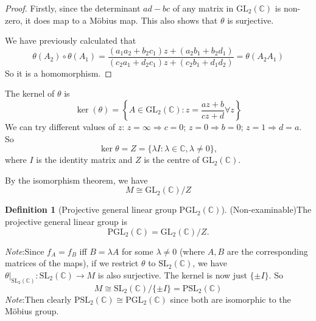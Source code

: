 \documentclass[a4paper]{article}
\theoremstyle{definition}
\newtheorem*{defi}{Definition}
\newcommand{\note}{\noindent \emph{Note}:\;}
\newcommand{\C}{\mathbb{C}}
\newcommand{\GL}{\mathrm{GL}}
\newcommand{\SL}{\mathrm{SL}}
\begin{document}
\begin{proof}
  Firstly, since the determinant $ad - bc$ of any matrix in $\GL_2(\C)$ is non-zero, it does map to a M\"obius map. This also shows that $\theta$ is surjective.

  We have previously calculated that
  \[
  \theta(A_2)\circ \theta(A_1) = \frac{(a_1a_2 + b_2c_1)z + (a_2b_1 + b_2d_1)}{(c_2a_1 + d_2c_1)z + (c_2b_1 + d_1d_2)} = \theta(A_2A_1)
  \]
So it is a homomorphism.
\end{proof}

The kernel of $\theta$ is
\[
\ker(\theta) = \left\{A\in \GL_2(\C): z = \frac{az + b}{cz + d}\forall z\right\}
\]
We can try different values of $z$: $z = \infty \Rightarrow c = 0$; $z = 0 \Rightarrow b = 0$; $z = 1\Rightarrow d = a$. So
\[
\ker\theta = Z = \{\lambda I: \lambda \in \C, \lambda\not= 0\},
\]
where $I$ is the identity matrix and $Z$ is the centre of $\GL_2(\C)$. 

By the isomorphism theorem, we have
\[
M \cong \GL_2(\C)/Z
\]

\begin{defi}[Projective general linear group $\mathrm{PGL}_2(\C)$]
  (Non-examinable)The projective general linear group is
\[
\mathrm{PGL}_2(\C) = \GL_2(\C)/Z.
\]
\end{defi}
\note Since $f_A = f_B$ iff $B = \lambda A$ for some $\lambda\not= 0$ (where $A, B$ are the corresponding matrices of the maps), if we restrict $\theta$ to $\SL_2(\C)$, we have $\left.\theta\right|_{\SL_2(\C)}: \SL_2(\C)\to M$ is also surjective. The kernel is now just $\{\pm I\}$. So
\[
M \cong \SL_2(\C)/\{\pm I\} = \mathrm{PSL_2}(\C)
\]
\note Then clearly $\mathrm{PSL}_2(\C)\cong \mathrm{PGL}_2(\C)$ since both are isomorphic to the M\"obius group.
\end{document}
